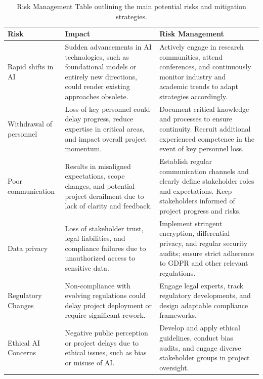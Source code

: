 \begin{table}[h]
\vspace{-15pt}
\centering
\scriptsize
\caption{Risk Management Table outlining the main potential risks and mitigation strategies.}\label{table:risks}
\begin{tabular}{|p{1.6cm}|p{6.7cm}|p{7.5cm}|}
\hline
\textbf{Risk} & \textbf{Impact} & \textbf{Risk Management} \\ \hline

Rapid shifts in AI & Sudden advancements in AI technologies, such as foundational models or entirely new directions, could render existing approaches obsolete. & Actively engage in research communities, attend conferences, and continuously monitor industry and academic trends to adapt strategies accordingly. \\ \hline

Withdrawal of personnel & Loss of key personnel could delay progress, reduce expertise in critical areas, and impact overall project momentum. & Document critical knowledge and processes to ensure continuity. Recruit additional experienced competence in the event of key personnel loss. \\ \hline

Poor communication & Results in misaligned expectations, scope changes, and potential project derailment due to lack of clarity and feedback. & Establish regular communication channels and clearly define stakeholder roles and expectations. Keep stakeholders informed of project progress and risks. \\ \hline

Data privacy & Loss of stakeholder trust, legal liabilities, and compliance failures due to unauthorized access to sensitive data. & Implement stringent encryption, differential privacy, and regular security audits; ensure strict adherence to GDPR and other relevant regulations. \\ \hline

Regulatory Changes & Non-compliance with evolving regulations could delay project deployment or require significant rework. & Engage legal experts, track regulatory developments, and design adaptable compliance frameworks. \\ \hline

Ethical AI Concerns & Negative public perception or project delays due to ethical issues, such as bias or misuse of AI. & Develop and apply ethical guidelines, conduct bias audits, and engage diverse stakeholder groups in project oversight. \\ \hline

\end{tabular}
\vspace{-10pt}
\end{table}
